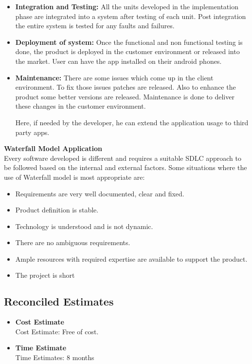 \documentclass[12pt,a4paper]{report}
\begin{document}
\begin{itemize}
\item \textbf{Integration and Testing:} All the units developed in the implementation phase are integrated into a system after testing of each unit. Post integration the entire system is tested for any faults and failures.
\item \textbf{Deployment of system:} Once the functional and non functional testing is done, the product is deployed in the customer environment or released into the market. User can have the app installed on their android phones.
\item \textbf{Maintenance:} There are some issues which come up in the client environment. To fix those issues patches are released. Also to enhance the product some better versions are released. Maintenance is done to deliver these changes in the customer environment. 

Here, if needed by the developer, he can extend the application usage to third party apps.
\end{itemize}

\textbf{Waterfall Model Application}\\
Every software developed is different and requires a suitable SDLC approach to be followed based on the internal and external factors. Some situations where the use of Waterfall model is most appropriate are:
\begin{itemize}
\item Requirements are very well documented, clear and fixed.
\item Product definition is stable.
\item Technology is understood and is not dynamic.
\item There are no ambiguous requirements.
\item Ample resources with required expertise are available to support the product.
\item The project is short
\end{itemize}

\subsection{Reconciled Estimates}
\begin{itemize}
	\item{\textbf{Cost Estimate}}\\
	Cost Estimate: Free of cost.
	
	\item{\textbf{Time Estimate}}\\
	Time Estimates: 8 months
	
\end{itemize}
\end{document}
